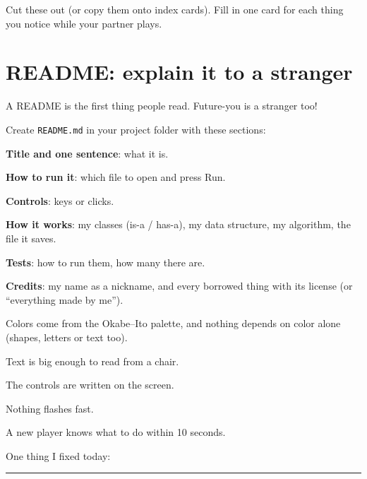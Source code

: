 \begin{exercise}
Cut these out (or copy them onto index cards). Fill in one card for each thing you notice while your partner plays.
\begin{center}
\end{center}
\end{exercise}

\section{README: explain it to a stranger}
A README is the first thing people read. Future-you is a stranger too!

\begin{exercise}
Create \texttt{README.md} in your project folder with these sections:
\begin{checklist}
  \item \textbf{Title and one sentence}: what it is.
  \item \textbf{How to run it}: which file to open and press Run.
  \item \textbf{Controls}: keys or clicks.
  \item \textbf{How it works}: my classes (is-a / has-a), my data structure, my algorithm, the file it saves.
  \item \textbf{Tests}: how to run them, how many there are.
  \item \textbf{Credits}: my name as a nickname, and every borrowed thing with its license (or \enquote{everything made by me}).
\end{checklist}
\end{exercise}

\begin{exercise}
\begin{checklist}
  \item Colors come from the Okabe--Ito palette, and nothing depends on color alone (shapes, letters or text too).
  \item Text is big enough to read from a chair.
  \item The controls are written on the screen.
  \item Nothing flashes fast.
  \item A new player knows what to do within 10 seconds.
  \item One thing I fixed today: \rule{6.5cm}{0.4pt}
\end{checklist}
\end{exercise}

